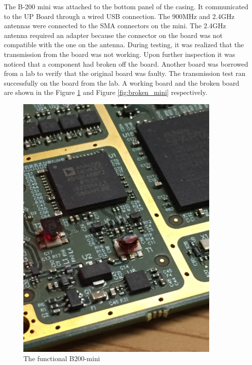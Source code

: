 The B-200 mini was attached to the bottom panel of the casing. It communicated to the UP Board through a wired USB connection. The 900MHz and 2.4GHz antennas were connected to the SMA connectors on the mini. The 2.4GHz antenna required an adapter because the connector on the board was not compatible with the one on the antenna. During testing, it was realized that the transmission from the board was not working. Upon further inspection it was noticed that a component had broken off the board. Another board was borrowed from a lab to verify that the original board was faulty. The transmission test ran successfully on the board from the lab. A working board and the broken board are shown in the Figure \ref{fig:working_mini} and Figure \ref{fig:broken_mini} respectively.
\begin{figure}[ht!]
\begin{minipage}{.5\textwidth}
  \centering
\includegraphics[width=0.9\textwidth]{img/working_mini.jpg}
\caption{The functional B200-mini}
\label{fig:working_mini}
\end{minipage}
\begin{minipage}{0.5\textwidth}

\end{minipage}
\end{figure}

